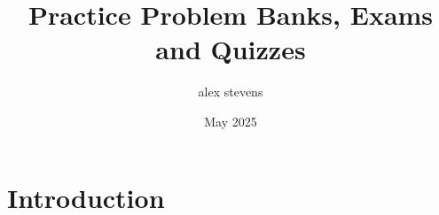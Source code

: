 \documentclass{article}
\title{Practice Problem Banks, Exams and Quizzes}
\author{alex stevens}
\date{May 2025}
\begin{document}
\maketitle

\section{Introduction}
\end{document}
